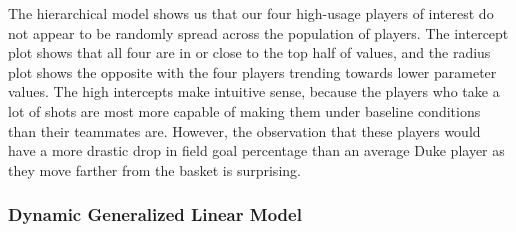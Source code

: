 \documentclass[12pt,twoside]{dukestatscithesis}
\theoremstyle{definition}
\theoremstyle{definition}
\theoremstyle{definition}
\theoremstyle{remark}
\begin{document}
The hierarchical model shows us that our four high-usage players of
interest do not appear to be randomly spread across the population of
players. The intercept plot shows that all four are in or close to the
top half of values, and the radius plot shows the opposite with the four
players trending towards lower parameter values. The high intercepts
make intuitive sense, because the players who take a lot of shots are
most more capable of making them under baseline conditions than their
teammates are. However, the observation that these players would have a
more drastic drop in field goal percentage than an average Duke player
as they move farther from the basket is surprising.

\subsubsection{Dynamic Generalized Linear
Model}\label{dynamic-generalized-linear-model}
\end{document}
